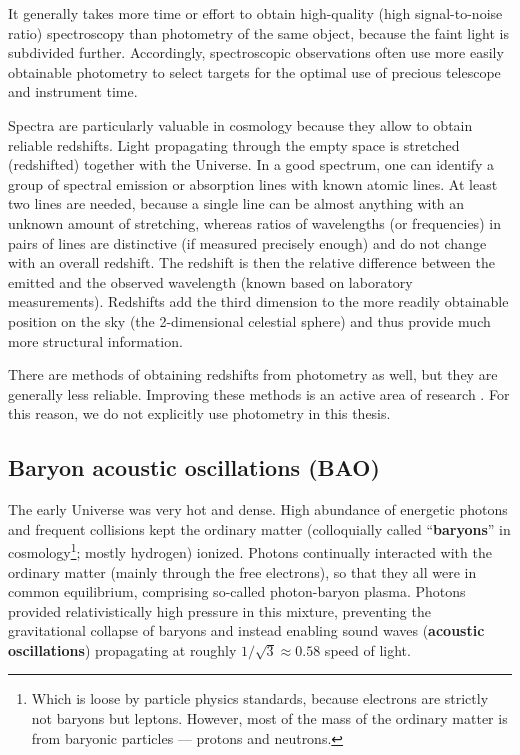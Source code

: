 It generally takes more time or effort to obtain high-quality (high signal-to-noise ratio) spectroscopy than photometry of the same object, because the faint light is subdivided further.
Accordingly, spectroscopic observations often use more easily obtainable photometry to select targets for the optimal use of precious telescope and instrument time.

Spectra are particularly valuable in cosmology because they allow to obtain reliable redshifts.
Light propagating through the empty space is stretched (redshifted) together with the Universe.
In a good spectrum, one can identify a group of spectral emission or absorption lines with known atomic lines.
At least two lines are needed, because a single line can be almost anything with an unknown amount of stretching, whereas ratios of wavelengths (or frequencies) in pairs of lines are distinctive (if measured precisely enough) and do not change with an overall redshift.
The redshift is then the relative difference between the emitted and the observed wavelength (known based on laboratory measurements).
Redshifts add the third dimension to the more readily obtainable position on the sky (the 2-dimensional celestial sphere) and thus provide much more structural information.

There are methods of obtaining redshifts from photometry as well, but they are generally less reliable.
Improving these methods is an active area of research \citep[see e.g.][]{DES-Y3-redshift-calibration,photo-z-Dey2021,photo-z-Dey2022}.
For this reason, we do not explicitly use photometry in this thesis.

\subsection{Baryon acoustic oscillations (BAO)}

The early Universe was very hot and dense.
High abundance of energetic photons and frequent collisions kept the ordinary matter (colloquially called ``{\bf baryons}'' in cosmology\footnote{Which is loose by particle physics standards, because electrons are strictly not baryons but leptons. However, most of the mass of the ordinary matter is from baryonic particles --- protons and neutrons.}; mostly hydrogen) ionized.
Photons continually interacted with the ordinary matter (mainly through the free electrons), so that they all were in common equilibrium, comprising so-called photon-baryon plasma.
Photons provided relativistically high pressure in this mixture, preventing the gravitational collapse of baryons and instead enabling sound waves ({\bf acoustic oscillations}) propagating at roughly $1/\sqrt{3} \approx 0.58$ speed of light.

